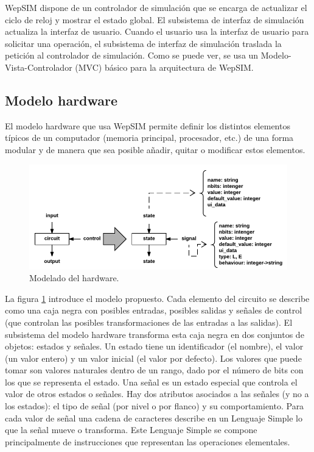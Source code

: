 WepSIM dispone de un controlador de simulación que se encarga de actualizar el ciclo de reloj y mostrar el estado global. El subsistema de interfaz de simulación actualiza la interfaz de usuario. Cuando el usuario usa la interfaz de usuario para solicitar una operación, el subsistema de interfaz de simulación traslada la petición al controlador de simulación. Como se puede ver, se usa un Modelo- Vista-Controlador (MVC) básico para la arquitectura de WepSIM.

\subsection{Modelo hardware}

El modelo hardware que usa WepSIM permite definir los distintos elementos típicos de un computador (memoria principal, procesador, etc.) de una forma modular y de manera que sea posible añadir, quitar o modificar estos elementos.

\begin{figure}[htbp]
 	\centering
 	\includegraphics[width=14cm]{figures/hardware_model}
 	\caption{Modelado del hardware.}
	\label{fig:hardware_model_diagram}
\end{figure}

La figura \ref{fig:hardware_model_diagram} introduce el modelo propuesto. Cada elemento del circuito se describe como una caja negra con posibles entradas, posibles salidas y señales de control (que controlan las posibles transformaciones de las entradas a las salidas). El subsistema del modelo hardware transforma esta caja negra en dos conjuntos de objetos: estados y señales. Un estado tiene un identificador (el nombre), el valor (un valor entero) y un valor inicial (el valor por defecto). Los valores que puede tomar son valores naturales dentro de un rango, dado por el número de bits con los que se representa el estado. Una señal es un estado especial que controla el valor de otros estados o señales. Hay dos atributos asociados a las señales (y no a los estados): el tipo de señal (por nivel o por flanco) y su comportamiento. Para cada valor de señal una cadena de caracteres describe en un Lenguaje Simple lo que la señal mueve o transforma. Este Lenguaje Simple se compone principalmente de instrucciones que representan las operaciones elementales.

